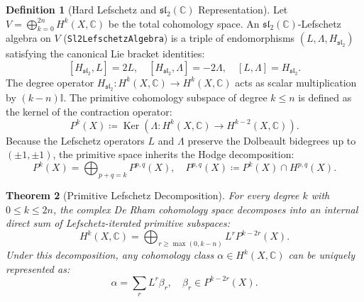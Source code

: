 \documentclass[11pt,a4paper]{article}
\theoremstyle{definition}
\newtheorem{definition}{Definition}[section]
\theoremstyle{plain}
\newtheorem{theorem}[definition]{Theorem}
\DeclareMathOperator{\Ker}{Ker}
\begin{document}
\begin{definition}[Hard Lefschetz and $\mathfrak{sl}_2(\mathbb{C})$ Representation]
\label{def:sl2_lefschetz_algebra}
Let $V = \bigoplus_{k=0}^{2n} H^k(X, \mathbb{C})$ be the total cohomology space. An $\mathfrak{sl}_2(\mathbb{C})$-Lefschetz algebra on $V$ (\texttt{Sl2LefschetzAlgebra}) is a triple of endomorphisms $(L, \Lambda, H_{\mathfrak{sl}_2})$ satisfying the canonical Lie bracket identities:
\begin{equation}
    \label{eq:sl2_relations}
    [H_{\mathfrak{sl}_2}, L] = 2L, \quad [H_{\mathfrak{sl}_2}, \Lambda] = -2\Lambda, \quad [L, \Lambda] = H_{\mathfrak{sl}_2}.
\end{equation}
The degree operator $H_{\mathfrak{sl}_2}: H^k(X, \mathbb{C}) \to H^k(X, \mathbb{C})$ acts as scalar multiplication by $(k - n)\mathbb{I}$. The primitive cohomology subspace of degree $k \le n$ is defined as the kernel of the contraction operator:
\begin{equation}
    P^k(X) \coloneqq \Ker\left( \Lambda: H^k(X, \mathbb{C}) \to H^{k-2}(X, \mathbb{C}) \right).
\end{equation}
Because the Lefschetz operators $L$ and $\Lambda$ preserve the Dolbeault bidegrees up to $(\pm 1, \pm 1)$, the primitive space inherits the Hodge decomposition:
\begin{equation}
    P^k(X) = \bigoplus_{p+q=k} P^{p,q}(X), \quad P^{p,q}(X) \coloneqq P^k(X) \cap H^{p,q}(X).
\end{equation}
\end{definition}

\begin{theorem}[Primitive Lefschetz Decomposition]
\label{thm:primitive_lefschetz_decomposition}
For every degree $k$ with $0 \le k \le 2n$, the complex De Rham cohomology space decomposes into an internal direct sum of Lefschetz-iterated primitive subspaces:
\begin{equation}
    \label{eq:primitive_lefschetz_sum}
    H^k(X, \mathbb{C}) = \bigoplus_{r \ge \max(0, k-n)} L^r P^{k-2r}(X).
\end{equation}
Under this decomposition, any cohomology class $\alpha \in H^k(X, \mathbb{C})$ can be uniquely represented as:
\begin{equation}
    \label{eq:primitive_expansion}
    \alpha = \sum_{r} L^r \beta_r, \quad \beta_r \in P^{k-2r}(X).
\end{equation}
\end{theorem}
\end{document}

